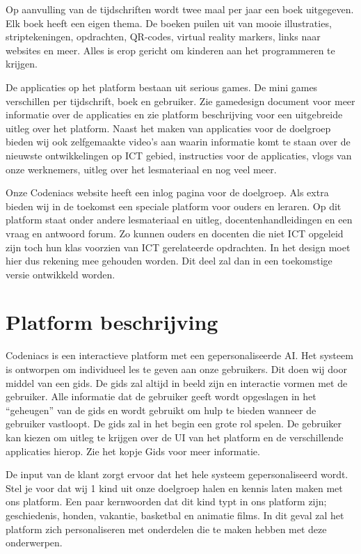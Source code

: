 \documentclass[]{report}
\begin{document}
Op aanvulling van de tijdschriften wordt twee maal per jaar een boek uitgegeven. Elk boek heeft een eigen thema. De boeken puilen uit van mooie illustraties, striptekeningen, opdrachten, QR-codes, virtual reality markers, links naar websites en meer. Alles is erop gericht om kinderen aan het programmeren te krijgen.

De applicaties op het platform bestaan uit serious games. De mini games verschillen per tijdschrift, boek en gebruiker. Zie gamedesign document voor meer informatie over de applicaties en zie platform beschrijving voor een uitgebreide uitleg over het platform.
Naast het maken van applicaties voor de doelgroep bieden wij ook zelfgemaakte video's aan waarin informatie komt te staan over de nieuwste ontwikkelingen op ICT gebied, instructies voor de applicaties, vlogs van onze werknemers, uitleg over het lesmateriaal en nog veel meer.

Onze Codeniacs website heeft een inlog pagina voor de doelgroep. Als extra bieden wij in de toekomst een speciale platform voor ouders en leraren. Op dit platform staat onder andere lesmateriaal en uitleg, docentenhandleidingen en een vraag en antwoord forum. Zo kunnen ouders en docenten die niet ICT opgeleid zijn toch hun klas voorzien van ICT gerelateerde opdrachten. In het design moet hier dus rekening mee gehouden worden. Dit deel zal dan in een toekomstige versie ontwikkeld worden.


\section{Platform beschrijving}
Codeniacs is een interactieve platform met een gepersonaliseerde AI. Het systeem is ontworpen om individueel les te geven aan onze gebruikers. Dit doen wij door middel van een gids. De gids zal altijd in beeld zijn en interactie vormen met de gebruiker. Alle informatie dat de gebruiker geeft wordt opgeslagen in het “geheugen” van de gids en wordt gebruikt om hulp te bieden wanneer de gebruiker vastloopt. De gids zal in het begin een grote rol spelen. De gebruiker kan kiezen om uitleg te krijgen over de UI van het platform en de verschillende applicaties hierop. Zie het kopje Gids voor meer informatie.

De input van de klant zorgt ervoor dat het hele systeem gepersonaliseerd wordt. Stel je voor dat wij 1 kind uit onze doelgroep halen en kennis laten maken met ons platform. Een paar kernwoorden dat dit kind typt in ons platform zijn; geschiedenis, honden, vakantie, basketbal en animatie films. In dit geval zal het platform zich personaliseren met onderdelen die te maken hebben met deze onderwerpen.
\end{document}
